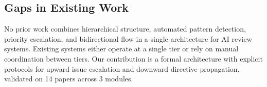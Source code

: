 \subsection{Gaps in Existing Work}

No prior work combines hierarchical structure, automated pattern detection, priority escalation, and bidirectional flow in a single architecture for AI review systems. Existing systems either operate at a single tier or rely on manual coordination between tiers. Our contribution is a formal architecture with explicit protocols for upward issue escalation and downward directive propagation, validated on 14 papers across 3 modules.